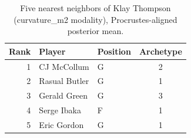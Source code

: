 \begin{table}[htbp]
  \centering\small
  \begin{tabular}{rllc}
    \toprule
    Rank & Player & Position & Archetype \\
    \midrule
    1 & CJ McCollum & G & 2 \\
    2 & Rasual Butler & G & 1 \\
    3 & Gerald Green & G & 3 \\
    4 & Serge Ibaka & F & 1 \\
    5 & Eric Gordon & G & 1 \\
    \bottomrule
  \end{tabular}
  \caption{Five nearest neighbors of Klay Thompson (curvature_m2 modality), Procrustes-aligned posterior mean.}
  \label{tab:Klay_Thompson_neighbors_curvature_m2}
\end{table}

